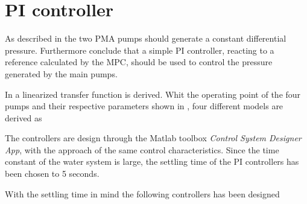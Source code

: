 \section{PI controller}
\label{pressure_control}

As described in  the two PMA pumps should generate a constant differential pressure. Furthermore  conclude that a simple PI controller, reacting to a reference calculated by the MPC, should be used to control the pressure generated by the main pumps. 

In  a linearized transfer function is derived. Whit the operating point of the four pumps and their respective parameters shown in , four different models are derived as 


The controllers are design through the Matlab toolbox \textit{Control System Designer App}, with the approach of the same control characteristics. Since the time constant of the water system is large, the settling time of the PI controllers has been chosen to 5 seconds. 

With the settling time in mind the following controllers has been designed







